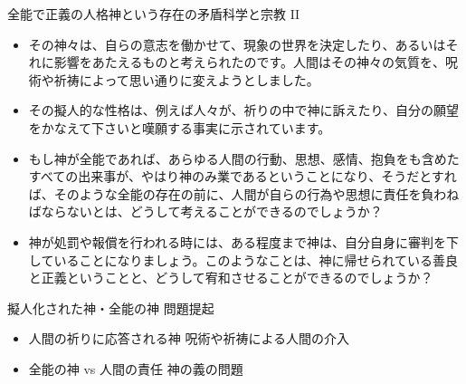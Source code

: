 \documentclass[10pt, dvipdfmx]{beamer}
\begin{document}
\begin{frame}{}

\begin{block}{全能で正義の人格神という存在の矛盾\hfill 科学と宗教 II}
\begin{itemize}
\item その神々は、自らの意志を働かせて、現象の世界を決定したり、あるいはそれに影響をあたえるものと考えられたのです。人間はその神々の気質を、呪術や祈祷によって思い通りに変えようとしました。
\item %
その擬人的な性格は、例えば人々が、祈りの中で神に訴えたり、自分の願望をかなえて下さいと嘆願する事実に示されています。
\item もし神が全能であれば、あらゆる人間の行動、思想、感情、抱負をも含めたすべての出来事が、やはり神のみ業であるということになり、そうだとすれば、そのような全能の存在の前に、人間が自らの行為や思想に責任を負わねばならないとは、どうして考えることができるのでしょうか？　
\item 神が処罰や報償を行われる時には、ある程度まで神は、自分自身に審判を下していることになりましょう。このようなことは、神に帰せられている善良と正義ということと、どうして宥和させることができるのでしょうか？
\end{itemize}
\end{block}

\begin{alertblock}{擬人化された神・全能の神 \hfill 問題提起}
\begin{itemize}
\item 人間の祈りに応答される神 \hfill 呪術や祈祷による人間の介入
\item 全能の神 vs 人間の責任 \hfill 神の義の問題
\end{itemize}
\end{alertblock}

\end{frame}

\end{document}
